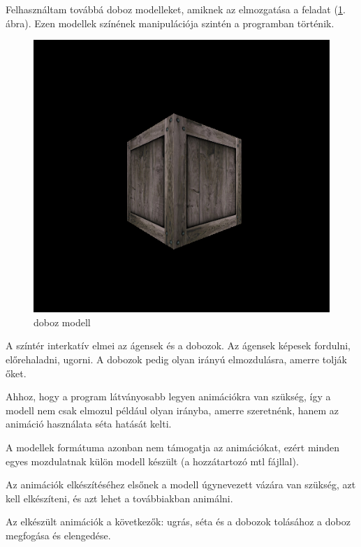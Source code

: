 Felhasználtam továbbá doboz modelleket, amiknek az elmozgatása a feladat (\ref{fig:box}. ábra). Ezen modellek színének manipulációja szintén a programban történik.

\begin{figure}[htp]
    \centering
   	\includegraphics[scale=0.5]{images/box.png}
	\caption{doboz modell}
	\label{fig:box}
\end{figure}


A színtér interkatív elmei az ágensek és a dobozok. 
Az ágensek képesek fordulni, előrehaladni, ugorni. 
A dobozok pedig olyan irányú elmozdulásra, amerre tolják őket.


Ahhoz, hogy a program látványosabb legyen animációkra van szükség, így a modell nem csak elmozul például olyan irányba, amerre szeretnénk, hanem az animáció használata séta hatását kelti.

A modellek formátuma azonban nem támogatja az animációkat, ezért minden egyes mozdulatnak külön modell készült (a hozzátartozó mtl fájllal).

Az animációk elkészítéséhez elsőnek a modell úgynevezett vázára van szükség, azt kell elkészíteni, és azt lehet a továbbiakban animálni. 
 
Az elkészült animációk a következők: ugrás, séta és a dobozok tolásához a doboz megfogása és elengedése.
 
